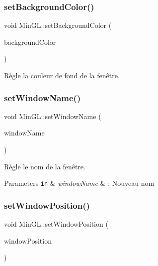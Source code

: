 \subsubsection{\texorpdfstring{set\+Background\+Color()}{setBackgroundColor()}}
{\footnotesize\ttfamily void Min\+G\+L\+::set\+Background\+Color (\begin{DoxyParamCaption}\item[{const \hyperlink{classns_graphics_1_1_r_g_b_acolor}{ns\+Graphics\+::\+R\+G\+B\+Acolor} \&}]{background\+Color }\end{DoxyParamCaption})}



Règle la couleur de fond de la fenêtre. 

\mbox{\label{class_min_g_l_a462ab2edc0eb28990638541873869e0e}} 
\subsubsection{\texorpdfstring{set\+Window\+Name()}{setWindowName()}}
{\footnotesize\ttfamily void Min\+G\+L\+::set\+Window\+Name (\begin{DoxyParamCaption}\item[{const std\+::string \&}]{window\+Name }\end{DoxyParamCaption})}



Règle le nom de la fenêtre. 


\begin{DoxyParams}[1]{Parameters}
\mbox{\tt in}  & {\em window\+Name} & \+: Nouveau nom \\
\hline
\end{DoxyParams}
\mbox{\label{class_min_g_l_a9239873a52e437457af03f002f5df2b6}} 
\subsubsection{\texorpdfstring{set\+Window\+Position()}{setWindowPosition()}}
{\footnotesize\ttfamily void Min\+G\+L\+::set\+Window\+Position (\begin{DoxyParamCaption}\item[{const \hyperlink{classns_graphics_1_1_vec2_d}{ns\+Graphics\+::\+Vec2D} \&}]{window\+Position }\end{DoxyParamCaption})}



